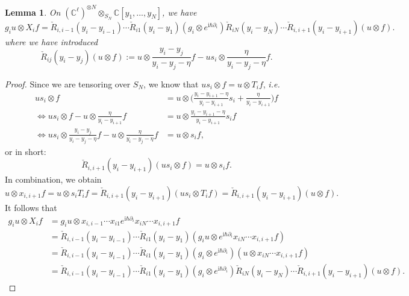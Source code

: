 \documentclass[11pt]{report}
\newtheorem{lemma}[theorem]{Lemma}
\theoremstyle{definition}
\theoremstyle{remark}
\theoremstyle{remark}
\newcommand{\C}{\mathbb{C}}
\newcommand{\I}{\mathrm{i}}
\begin{document}
\begin{lemma}
On $(\C^\ell)^{\otimes N} \otimes_{S_N} \C[y_1,...,y_N]$, we have
\begin{equation*}
g_i u \otimes X_i f = \check R_{i,i-1}(y_i-y_{i-1}) \cdots \check R_{i1}(y_i-y_1) (g_i \otimes e^{\I \hbar \partial_i}) \check R_{iN}(y_i-y_N) \cdots \check R_{i,i+1}(y_i-y_{i+1}) (u \otimes f).
\end{equation*}
where we have introduced
\begin{equation*}
\check R_{ij}(y_i-y_j) (u \otimes f) := u \otimes \frac{y_i-y_j}{y_i-y_j-\eta} f - u s_i \otimes \frac{\eta}{y_i-y_j-\eta} f.
\end{equation*}
\end{lemma}

\begin{proof}
Since we are tensoring over $S_N$, we know that $u s_i \otimes f = u \otimes T_i f$, \emph{i.e.}
\begin{align*}
us_i  \otimes f &= u \otimes \bigg( \frac{y_i-y_{i+1}-\eta}{y_i-y_{i+1}} s_i + \frac{\eta}{y_i-y_{i+1}} \bigg) f \\
\Leftrightarrow u s_i \otimes f - u \otimes \frac{\eta}{y_i-y_{i+1}} f &= u \otimes \frac{y_i-y_{i+1}-\eta}{y_i-y_{i+1}} s_i f \\
\Leftrightarrow u s_i \otimes \frac{y_i-y_j}{y_i-y_j-\eta} f - u \otimes \frac{\eta}{y_i-y_j-\eta} f &= u \otimes s_i f,
\end{align*}
or in short:
\begin{equation*}
\check R_{i,i+1}(y_i-y_{i+1}) (u s_i \otimes f) = u \otimes s_i f.
\end{equation*}
In combination, we obtain
\begin{equation*}
u \otimes x_{i,i+1} f = u \otimes s_i T_i f = \check R_{i,i+1}(y_i-y_{i+1}) (u s_i \otimes T_i f) = \check R_{i,i+1}(y_i-y_{i+1})(u \otimes f).
\end{equation*}
It follows that
\begin{align*}
g_i u \otimes X_i f
&= g_i u \otimes x_{i,i-1} \cdots x_{i1} e^{\I \hbar \partial_i} x_{iN} \cdots x_{i,i+1} f \\
&= \check R_{i,i-1}(y_i-y_{i-1}) \cdots \check R_{i1}(y_i-y_1) (g_i u \otimes e^{\I \hbar \partial_i} x_{iN} \cdots x_{i,i+1} f) \\
&= \check R_{i,i-1}(y_i-y_{i-1}) \cdots \check R_{i1}(y_i-y_1) (g_i \otimes e^{\I \hbar \partial_i}) (u \otimes x_{iN} \cdots x_{i,i+1} f) \\
&= \check R_{i,i-1}(y_i-y_{i-1}) \cdots \check R_{i1}(y_i-y_1) (g_i \otimes e^{\I \hbar \partial_i}) \check R_{iN}(y_i-y_N) \cdots \check R_{i,i+1}(y_i-y_{i+1}) (u \otimes f).
\end{align*}
\end{proof}
\end{document}
